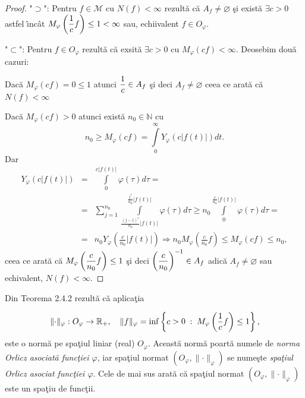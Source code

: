 \documentclass[ a4paper, 12pt]{report}
\theoremstyle{definition}
\theoremstyle{remark}
\numberwithin{equation}{section}
\begin{document}
\begin{proof}
"$\supset$": Pentru $f \in \mathcal{M}$ cu $N(f) < \infty$ rezult\u a c\u a $A_f \neq \varnothing$ \c si exist\u a $\exists c>0$ astfel \^\i nc\^ at  $M_\varphi \left(\displaystyle\frac{1}{c}f \right) \leq 1 < \infty$ sau, echiivalent $f \in O_\varphi$.

"$\subset$": Pentru $f \in O_\varphi$ rezult\u a c\u a exsit\u a $\exists c >0$ cu $M_\varphi (cf) < \infty$. Deosebim dou\u a cazuri:

Dac\u a $M_\varphi (cf) = 0 \leq 1$ atunci $\displaystyle\frac{1}{c} \in A_f$ \c si deci $A_f \neq \varnothing$ ceea ce arat\u a  c\u a $N(f)<\infty$

Dac\u a $M_\varphi (cf) > 0$ atunci exist\u a $n_0 \in \mathbb{N}$ cu
$$n_0\geq M_\varphi (cf) = \int\limits_{0}^{\infty} Y_\varphi (c \lvert f(t) \rvert) dt.$$
Dar
\begin{eqnarray*}
Y_\varphi (c \lvert f(t) \rvert) &=& \int\limits_{0}^{c\lvert f(t) \rvert} \varphi(\tau) d\tau = \\
&=&\sum\limits_{j=1}^{n_0} \int\limits_{\frac{(j-1)^c}{n_0} \lvert f(t) \rvert}^{\frac{j^c}{n_0}\lvert f(t) \rvert} \varphi (\tau) d\tau \geq n_0 \int\limits_{0}^{\frac{c}{n_0} \lvert f(t) \rvert}  \varphi(\tau) d\tau = \\
&=& n_0 Y_\varphi\left (\frac{c}{n_0}\lvert f(t) \rvert \right) \Rightarrow n_0 M_\varphi \left (\frac{c}{n_0}f \right ) \leq M_\varphi (cf) \leq n_0,
 \end{eqnarray*}
ceea ce arat\u a c\u a $M_\varphi \left(\displaystyle\frac{c}{n_0}f \right ) \leq 1$ \c si deci ${\left(\displaystyle\frac{c}{n_0}\right)}^{-1} \in A_f$ adic\u a $A_f \neq \varnothing$ sau echivalent, $N(f) < \infty$.
\end{proof}

\smallskip

Din Teorema 2.4.2 rezult\u a c\u a aplica\c tia

$$\lVert \cdot \rVert _\varphi : O_\varphi \to \mathbb{R}_+, \quad \lVert f \rVert _\varphi = \inf \left\{ c > 0 \; : \; M_\varphi \left(\displaystyle\frac{1}{c}f \right)\leq 1 \right\},$$
este o norm\u a pe spa\c tiul liniar (real) $O_\varphi$. Aceast\u a norm\u a poart\u a numele de {\it norma Orlicz asociat\u a func\c tiei $\varphi$}, iar spa\c tiul normat $(O_\varphi, \lVert \cdot \rVert_\varphi)$ se nume\c ste {\it spa\c tiul Orlicz asociat func\c tiei $\varphi$}. Cele de mai sus arat\u a c\u a spa\c tiul normat $(O_\varphi, \lVert \cdot \rVert_\varphi)$ este un spa\c tiu de func\c tii.
\end{document}
